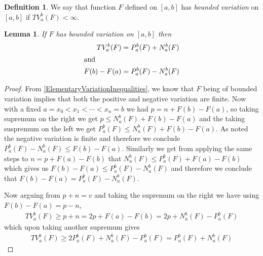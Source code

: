 \documentclass{amsart}
\newtheorem{lem}[thm]{Lemma}
\theoremstyle{remark}
\theoremstyle{definition}
\newtheorem{defn}[thm]{Definition}
\begin{document}
\begin{defn}We say that  function $F$ defined on $[a,b]$ has
  \emph{bounded variation} on $[a,b]$ if $TV_a^b(F) < \infty$.
\end{defn}

\begin{lem}\label{TotalVariationAsSumOfPositiveAndNegativeVariation}If $F$ has bounded variation on $[a,b]$ then 
\begin{align*}
TV_a^b(F) &= P_a^b(F) + N_a^b(F) \\
\intertext{and}
F(b) - F(a) &=  P_a^b(F) - N_a^b(F) 
\end{align*}
\end{lem}
\begin{proof}
From \ref{ElementaryVariationInequalities}, we know that $F$ being of
bounded variation implies that both the positive and negative
variation are finite.  Now with a fixed $a=x_0 < x_1 < \dotsb < x_n=b$
we had $p  = n + F(b) - F(a)$, so taking supremum on the right we get
$p  \leq N_a^b(F) + F(b) - F(a)$
and the taking suspremum on the left we get $P_a^b(F)  \leq N_a^b(F) +
F(b) - F(a)$.  As noted the negative variation is finite and therefore
we conclude $P_a^b(F)  - N_a^b(F) \leq
F(b) - F(a)$. Similarly we get from applying the same steps to $n = p
+ F(a) - F(b)$
that $N_a^b(F) \leq P_a^b(F) + F(a) - F(b)$ which gives us $F(b) -F(a)
\leq P_a^b(F)  - N_a^b(F)$ and therefore we conclude that $F(b) -F(a)
= P_a^b(F)  - N_a^b(F)$.

Now arguing from $p + n = v$ and taking the supremum on the right we
have using $F(b) - F(a) = p -n$,
\begin{align*}
TV_a^b(F) \geq p+n = 2p + F(a) - F(b) = 2p + N_a^b(F) - P_a^b(F)
\end{align*}
which upon taking another supremum gives
\begin{align*}
TV_a^b(F) \geq 2P_a^b(F) + N_a^b(F) - P_a^b(F) = P_a^b(F) + N_a^b(F)
\end{align*}


\end{proof}
\end{document}
